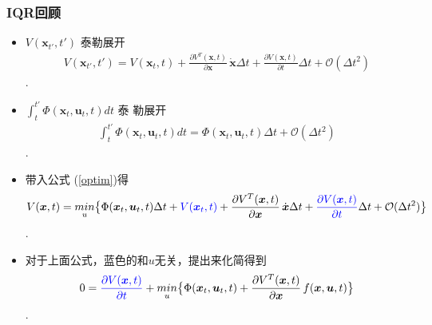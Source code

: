 \documentclass[UTF8, aspectratio=169, 10pt]{ctexbeamer}
\begin{document}
\begin{frame}
  \frametitle{IQR回顾}
  \begin{itemize}
  \item $V( \boldsymbol{x}_{t'}, t' )$ 泰勒展开
    \begin{align}
      V( \boldsymbol{x}_{t'}, t' ) = V( \boldsymbol{x}_{t}, t ) + \frac{
      \partial V^T ( \boldsymbol{x}, t  ) } { \partial
      \boldsymbol{x}  } \, \dot { \boldsymbol{x} }  \Delta t + \frac{ \partial V
      ( \boldsymbol{x}, t )}{ \partial t } \Delta t + \mathcal{O} ( \Delta t^2 )
    \end{align}.
  \item $      \int_t^{t'}\Phi( \boldsymbol{x}_t,  \boldsymbol{u}_t, t ) dt$ 泰
    勒展开
    \begin{align}
            \int_t^{t'}\Phi( \boldsymbol{x}_t,  \boldsymbol{u}_t, t ) dt = \Phi(
      \boldsymbol{x}_t,  \boldsymbol{u}_t, t ) \Delta t + \mathcal{O} (\Delta
      t^2 )
    \end{align}.
  \item 带入公式 (\ref{optim})得
    \begin{align}
      V( \boldsymbol{x}, t ) = \underset{u}{min} \big \{
      \Phi(
      \boldsymbol{x}_t,  \boldsymbol{u}_t, t ) \Delta t + \textcolor{blue} { V(
      \boldsymbol{x}_{t}, t ) } + \frac{
      \partial V^T ( \boldsymbol{x}, t  ) } { \partial
      \boldsymbol{x}  } \, \dot { \boldsymbol{x} }  \Delta t + \textcolor{blue} { \frac{ \partial V
      ( \boldsymbol{x}, t )}{ \partial t } } \Delta t
      + \mathcal{O} (\Delta
      t^2 )
      \big \}
    \end{align}.
  \item 对于上面公式，蓝色的和$u$无关，提出来化简得到
    \begin{align}
      \label{hjb}
      0 = \textcolor{blue} { \frac{ \partial V
      ( \boldsymbol{x}, t )}{ \partial t } }  +
      \underset{u}{min} \big \{
      \Phi(
      \boldsymbol{x}_t,  \boldsymbol{u}_t, t )  + \frac{
      \partial V^T ( \boldsymbol{x}, t  ) } { \partial
      \boldsymbol{x}  } \, f(\boldsymbol{x}, \boldsymbol{u}, t)
      \big \}
    \end{align}.

  \end{itemize}
\end{frame}
\end{document}
